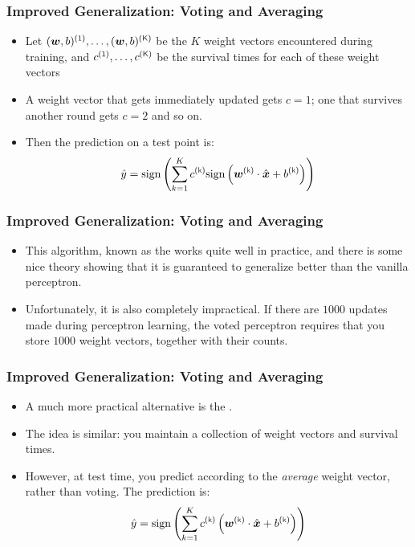 \documentclass[trans]{beamer}
\begin{document}
\begin{frame}
  \frametitle{Improved Generalization: Voting and Averaging}
\begin{itemize}
\item 
Let $(\vw,b)\oth, \dots,
(\vw,b)\Kth$ be the $K$ weight vectors encountered during training,
and $c\oth, \dots, c\Kth$ be the survival times for each of these
weight vectors
\item A weight vector that gets immediately updated gets
$c=1$; one that survives another round gets $c=2$ and so on.
\item  Then
the prediction on a test point is:
\begin{equation} \label{eq:perc:vote}
  \hat y = \sign \left(
    \sum_{k=1}^K c\kth 
      \sign \left(
        \dotp{\vw\kth}{\hat\vx} + b\kth
        \right)
      \right)
\end{equation}
\end{itemize}
\end{frame}
\begin{frame}
  \frametitle{Improved Generalization: Voting and Averaging}
\begin{itemize}
\item 
This algorithm, known as the  works quite
well in practice, and there is some nice theory showing that it is
guaranteed to generalize better than the vanilla perceptron.
\item 
Unfortunately, it is also completely impractical.  If there are $1000$
updates made during perceptron learning, the voted perceptron requires
that you store $1000$ weight vectors, together with their counts.

\end{itemize}
\end{frame}
\begin{frame}
  \frametitle{Improved Generalization: Voting and Averaging}
\begin{itemize}
\item 
A much more practical alternative is the .
  \item  The idea is similar: you maintain a collection of
weight vectors and survival times.  
\item However, at test time, you predict
according to the \emph{average} weight vector, rather than 
voting. The prediction is:
\begin{equation} \label{eq:perc:avg}
  \hat y = \sign \left(
    \sum_{k=1}^K c\kth 
      \left(
        \dotp{\vw\kth}{\hat\vx} + b\kth
        \right)
      \right)
\end{equation}
\end{itemize}
\end{frame}
\end{document}
